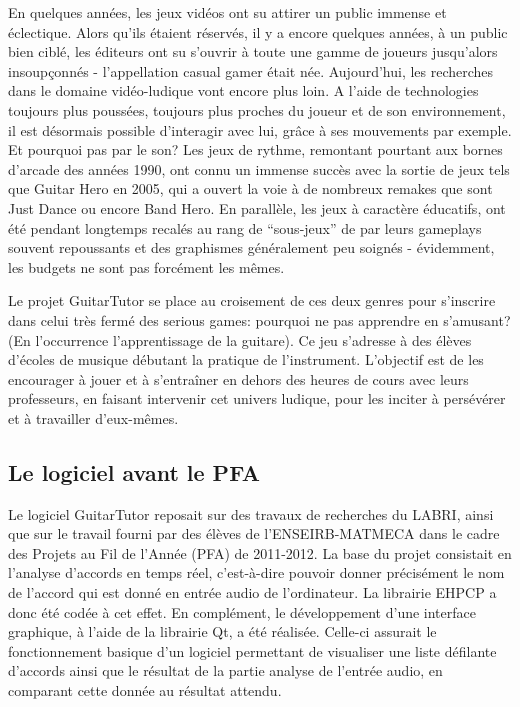 \documentclass[a4paper,11pt]{article}
\begin{document}
En quelques années, les jeux vidéos ont su attirer un public immense et éclectique. Alors qu'ils étaient réservés, il y a encore quelques années, à un public bien ciblé, les éditeurs ont su s'ouvrir à toute une gamme de joueurs jusqu'alors insoupçonnés - l'appellation casual gamer était née. Aujourd'hui, les recherches dans le domaine vidéo-ludique vont encore plus loin. A l'aide de technologies toujours plus poussées, toujours plus proches du joueur et de son environnement, il est désormais possible d'interagir avec lui, grâce à ses mouvements par exemple. Et pourquoi pas par le son? Les jeux de rythme, remontant pourtant aux bornes d'arcade des années 1990, ont connu un immense succès avec la sortie de jeux tels que Guitar Hero en 2005, qui a ouvert la voie à de nombreux remakes que sont Just Dance ou encore Band Hero. En parallèle, les jeux à caractère éducatifs, ont été pendant longtemps recalés au rang de “sous-jeux” de par leurs gameplays souvent repoussants et des graphismes généralement peu soignés -
évidemment, les budgets ne sont pas forcément les mêmes.

Le projet GuitarTutor se place au croisement de ces deux genres pour s'inscrire dans celui très fermé des serious games: pourquoi ne pas apprendre en s'amusant? (En l'occurrence l'apprentissage de la guitare). Ce jeu s'adresse à des élèves d'écoles de musique débutant la pratique de l'instrument. L'objectif est de les encourager à jouer et à s'entraîner en dehors des heures de cours avec leurs professeurs, en faisant intervenir cet univers ludique, pour les inciter à persévérer et à travailler d'eux-mêmes.

\subsection*{Le logiciel avant le PFA}

Le logiciel GuitarTutor reposait sur des travaux de recherches du \ac{LABRI}, ainsi que sur le travail fourni par des élèves de l'ENSEIRB-MATMECA dans le cadre des Projets au Fil de l'Année (PFA) de 2011-2012. La base du projet consistait en l'analyse d'accords en temps réel, c'est-à-dire pouvoir donner précisément le nom de l'accord qui est donné en entrée audio de l'ordinateur. La librairie EHPCP a donc été codée à cet effet. En complément, le développement d'une interface graphique, à l'aide de la librairie Qt, a été réalisée. Celle-ci assurait le fonctionnement basique d'un logiciel permettant de visualiser une liste défilante d'accords ainsi que le résultat de la partie analyse de l'entrée audio, en comparant cette donnée au résultat attendu.
\end{document}
